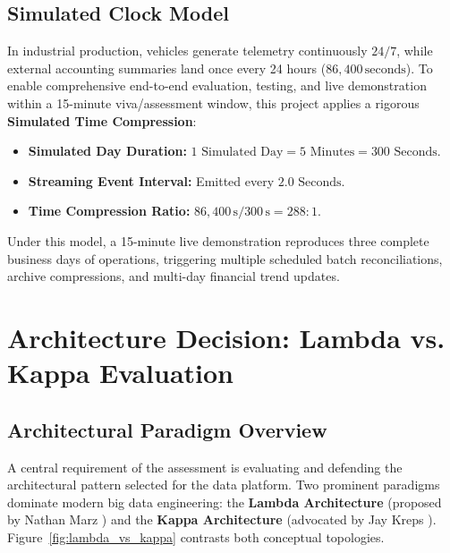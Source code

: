 \documentclass[11pt,a4paper]{article}
\begin{document}
\subsection{Simulated Clock Model}
In industrial production, vehicles generate telemetry continuously $24/7$, while external accounting summaries land once every 24 hours ($86{,}400\,\text{seconds}$). To enable comprehensive end-to-end evaluation, testing, and live demonstration within a 15-minute viva/assessment window, this project applies a rigorous \textbf{Simulated Time Compression}:
\begin{itemize}
    \item \textbf{Simulated Day Duration:} $1 \text{ Simulated Day} = 5 \text{ Minutes} = 300 \text{ Seconds}$.
    \item \textbf{Streaming Event Interval:} Emitted every $2.0 \text{ Seconds}$.
    \item \textbf{Time Compression Ratio:} $86{,}400\,\text{s} / 300\,\text{s} = 288 : 1$.
\end{itemize}
Under this model, a 15-minute live demonstration reproduces three complete business days of operations, triggering multiple scheduled batch reconciliations, archive compressions, and multi-day financial trend updates.

\section{Architecture Decision: Lambda vs. Kappa Evaluation}
\subsection{Architectural Paradigm Overview}
A central requirement of the assessment is evaluating and defending the architectural pattern selected for the data platform. Two prominent paradigms dominate modern big data engineering: the \textbf{Lambda Architecture} (proposed by Nathan Marz \cite{marz2015big}) and the \textbf{Kappa Architecture} (advocated by Jay Kreps \cite{kreps2014questioning}). Figure~\ref{fig:lambda_vs_kappa} contrasts both conceptual topologies.
\end{document}
